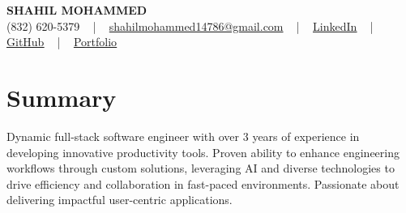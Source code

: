 \documentclass[letterpaper,10pt]{article}
\begin{document}
\begin{center}
    {\fontsize{14pt}{12pt}\selectfont \textbf{\MakeUppercase{Shahil Mohammed}}}\\ \vspace{2pt}
    \fontsize{10pt}{12pt}\selectfont (832) 620-5379 ~ | ~ \href{mailto:shahilmohammed14786@gmail.com}{shahilmohammed14786@gmail.com} ~ | ~  
    \href{https://www.linkedin.com/in/shahil-mohammed-9652931a1/}{\color{blue}\underline{LinkedIn}}  ~ | ~ 
    \href{https://github.com/freakbeast14}{\color{blue}\underline{GitHub}} ~ | ~ 
    \href{https://shahil-mohammed.netlify.app/}{\color{blue}\underline{Portfolio}}
    \vspace{-8pt}
\end{center}

\section{Summary}
\vspace{-2pt}\fontsize{8pt}{9pt}\selectfont
Dynamic full-stack software engineer with over 3 years of experience in developing innovative productivity tools. Proven ability to enhance engineering workflows through custom solutions, leveraging AI and diverse technologies to drive efficiency and collaboration in fast-paced environments. Passionate about delivering impactful user-centric applications.

\vspace{-5pt}
 
\vspace{-2pt}
\end{document}
